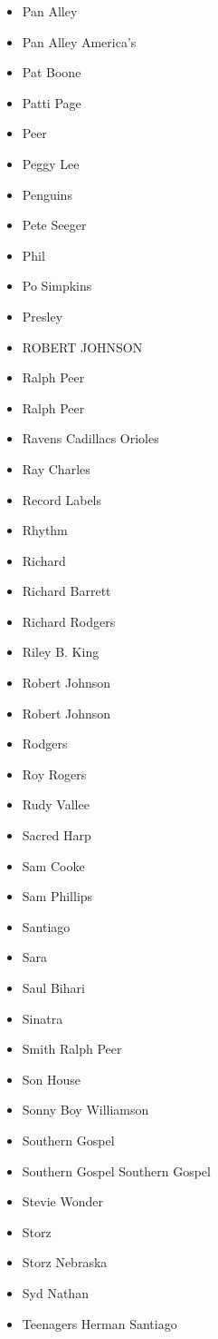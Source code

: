 \documentclass[12pt,a4paper]{article}
\begin{document}
\begin{itemize}
  \item Pan Alley
  \item Pan Alley America's
  \item Pat Boone
  \item Patti Page
  \item Peer
  \item Peggy Lee
  \item Penguins
  \item Pete Seeger
  \item Phil
  \item Po Simpkins
  \item Presley
  \item ROBERT JOHNSON
  \item Ralph Peer
  \item Ralph Peer
  \item Ravens Cadillacs Orioles
  \item Ray Charles
  \item Record Labels
  \item Rhythm
  \item Richard
  \item Richard Barrett
  \item Richard Rodgers
  \item Riley B. King
  \item Robert Johnson
  \item Robert Johnson
  \item Rodgers
  \item Roy Rogers
  \item Rudy Vallee
  \item Sacred Harp
  \item Sam Cooke
  \item Sam Phillips
  \item Santiago
  \item Sara
  \item Saul Bihari
  \item Sinatra
  \item Smith Ralph Peer
  \item Son House
  \item Sonny Boy Williamson
  \item Southern Gospel
  \item Southern Gospel Southern Gospel
  \item Stevie Wonder
  \item Storz
  \item Storz Nebraska
  \item Syd Nathan
  \item Teenagers Herman Santiago

\end{itemize}
\end{document}
